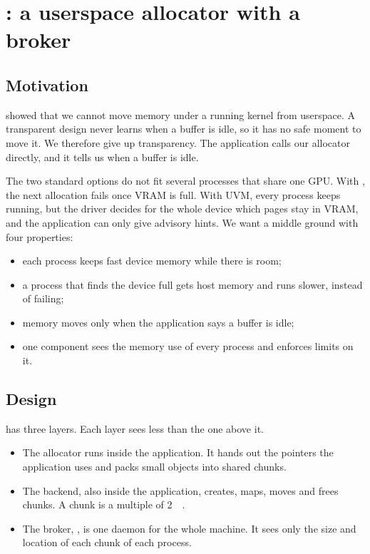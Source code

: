 \section{\libvmem: a userspace allocator with a broker}
\label{sec:libvmem}

\subsection{Motivation}
\label{sec:lv-motivation}

 showed that we cannot move memory under a running kernel
from userspace. A transparent design never learns when a buffer is idle, so
it has no safe moment to move it. We therefore give up transparency. The
application calls our allocator directly, and it tells us when a buffer is
idle.

The two standard options do not fit several processes that share one GPU.
With , the next allocation fails once VRAM is full. With
UVM, every process keeps running, but the driver decides for the whole device
which pages stay in VRAM, and the application can only give advisory hints.
We want a middle ground with four properties:

\begin{itemize}
  \item each process keeps fast device memory while there is room;
  \item a process that finds the device full gets host memory and runs
    slower, instead of failing;
  \item memory moves only when the application says a buffer is idle;
  \item one component sees the memory use of every process and enforces
    limits on it.
\end{itemize}

\subsection{Design}
\label{sec:lv-design}

\libvmem has three layers. Each layer sees less than the one above it.

\begin{itemize}
  \item The allocator runs inside the application. It hands out the pointers
    the application uses and packs small objects into shared chunks.
  \item The backend, also inside the application, creates, maps, moves and
    frees chunks. A chunk is a multiple of \SI{2}{\mebi\byte}.
  \item The broker, \vmemd, is one daemon for the whole machine. It sees only
    the size and location of each chunk of each process.
\end{itemize}

